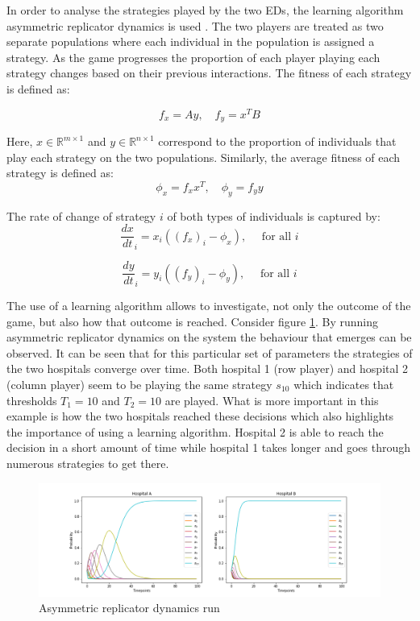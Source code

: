 In order to analyse the strategies played by the two EDs, the learning algorithm
asymmetric replicator dynamics is used \cite{asymmetricreplicatordynamics}.
The two players are treated as two separate populations where each 
individual in the population is assigned a strategy. 
As the game progresses the proportion of each player playing each strategy 
changes based on their previous interactions.
The fitness of each strategy is defined as:

\begin{equation}\label{eq:asymmetric_fitness}
    f_x = Ay, \quad f_y = x^T B
\end{equation}

Here, \(x \in \mathbb{R}^{m \times 1} \) and
\(y \in \mathbb{R}^{n \times 1}\) correspond to the proportion of individuals 
that play each strategy on the two populations.
Similarly, the average fitness of each strategy is defined as:
\begin{equation}
    \phi_x = f_x x^T, \quad \phi_y = f_y y
\end{equation}

The rate of change of strategy \( i \) of both types of individuals is captured 
by:
\begin{equation}
    \frac{dx}{dt}_i = x_i((f_x)_i - \phi_x), \quad \text{ for all }i
\end{equation}

\begin{equation}
    \frac{dy}{dt}_i = y_i((f_y)_i - \phi_y), \quad \text{ for all }i
\end{equation}

The use of a learning algorithm allows to investigate, not only the outcome of 
the game, but also how that outcome is reached.
Consider figure \ref{fig:ard_by_itself}. 
By running asymmetric replicator dynamics on the system the behaviour that 
emerges can be observed.
It can be seen that for this particular set of parameters the strategies of 
the two hospitals converge over time. 
Both hospital 1 (row player) and hospital 2 (column player) seem to be playing 
the same strategy \(s_{10}\) which indicates that thresholds \(T_1 = 10\) and 
\(T_2 = 10\) are played.
What is more important in this example is how the two hospitals reached these
decisions which also highlights the importance of using a learning algorithm.
Hospital 2 is able to reach the decision in a short amount of time while 
hospital 1 takes longer and goes through numerous strategies to get there.

\begin{figure}[H]
    \centering
    \includegraphics[scale=0.4, trim=120 0 120 0]{imgs/asymmetric_rd/asymmetric_rd.png}
    \caption{Asymmetric replicator dynamics run}
    \label{fig:ard_by_itself}
\end{figure}

